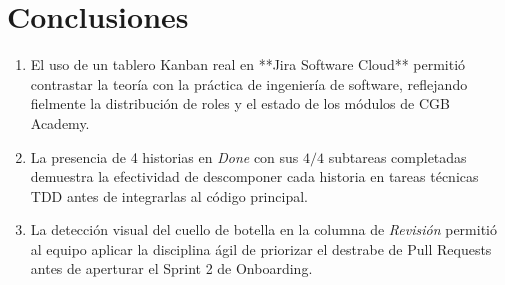 \documentclass[11pt,a4paper]{article}
\begin{document}
\section{Conclusiones}
\begin{enumerate}
    \item El uso de un tablero Kanban real en **Jira Software Cloud** permitió contrastar la teoría con la práctica de ingeniería de software, reflejando fielmente la distribución de roles y el estado de los módulos de CGB Academy.
    \item La presencia de 4 historias en \textit{Done} con sus $4/4$ subtareas completadas demuestra la efectividad de descomponer cada historia en tareas técnicas TDD antes de integrarlas al código principal.
    \item La detección visual del cuello de botella en la columna de \textit{Revisión} permitió al equipo aplicar la disciplina ágil de priorizar el destrabe de Pull Requests antes de aperturar el Sprint 2 de Onboarding.
\end{enumerate}
\end{document}
